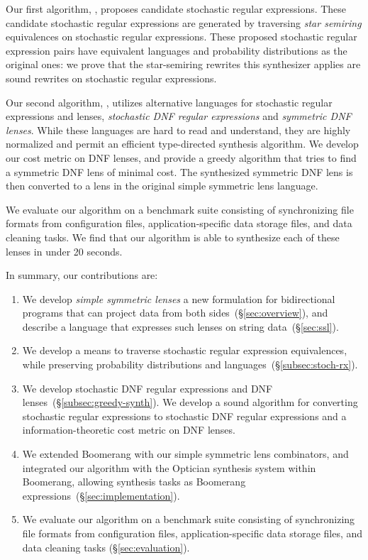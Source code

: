 \documentclass[acmsmall,screen,anonymous]{acmart}
\begin{document}
Our first algorithm, \RXSearch, proposes candidate stochastic regular
expressions. These candidate stochastic regular expressions are generated by
traversing \emph{star semiring} equivalences on stochastic regular expressions.
These proposed stochastic regular expression pairs have equivalent languages and
probability distributions as the original ones: we prove that the star-semiring
rewrites this synthesizer applies are sound rewrites on stochastic regular
expressions.

Our second algorithm, \GreedySynth, utilizes alternative languages for
stochastic regular expressions and lenses, \emph{stochastic DNF regular
  expressions} and \emph{symmetric DNF lenses}. While these languages are hard
to read and understand, they are highly normalized and permit an efficient
type-directed synthesis algorithm. We develop our cost metric on DNF lenses, and
provide a greedy algorithm that tries to find a symmetric DNF lens of minimal
cost. The synthesized symmetric DNF lens is then converted to a lens in the
original simple symmetric lens language.


We evaluate our algorithm on a benchmark suite consisting of synchronizing file
formats from configuration files, application-specific data storage files, and
data cleaning tasks. We find that our algorithm is able to synthesize each of
these lenses in under 20 seconds.

In summary, our contributions are:
\begin{enumerate}
\item We develop \emph{simple symmetric lenses} a new formulation for
  bidirectional programs that can project data from both sides~(\S\ref{sec:overview}),
  and describe a language that expresses such lenses on string
  data~(\S\ref{sec:ssl}).   
\item We develop a means to traverse stochastic regular expression equivalences,
  while preserving probability distributions and
  languages~(\S\ref{subsec:stoch-rx}).
\item We develop stochastic DNF regular expressions and DNF
  lenses~(\S\ref{subsec:greedy-synth}). We develop a sound algorithm for
  converting stochastic regular expressions to stochastic DNF regular
  expressions and a information-theoretic cost metric on DNF lenses.
\item We extended Boomerang with our simple symmetric lens combinators, and
  integrated our algorithm with the Optician synthesis system within Boomerang,
  allowing synthesis tasks as Boomerang
  expressions~(\S\ref{sec:implementation}).
\item We evaluate our algorithm on a benchmark suite consisting of synchronizing
  file formats from configuration files, application-specific data storage
  files, and data cleaning tasks (\S\ref{sec:evaluation}).  
\end{enumerate}
\end{document}

